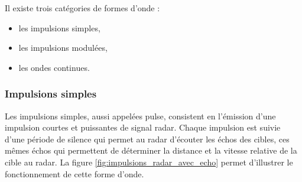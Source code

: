 Il existe trois catégories de formes d'onde : 
\begin{itemize}
    \item les impulsions simples,
    \item les impulsions modulées,
    \item les ondes continues.
\end{itemize}

\subsubsection{Impulsions simples}
Les impulsions simples, aussi appelées pulse, consistent en l'émission d'une impulsion courtes et puissantes de signal radar. Chaque impulsion est suivie d'une période de silence qui permet au radar d'écouter les échos des cibles, ces mêmes échos qui permettent de déterminer la distance et la vitesse relative de la cible au radar. La figure \ref{fig:impulsions_radar_avec_echo} permet d'illustrer le fonctionnement de cette forme d'onde.

